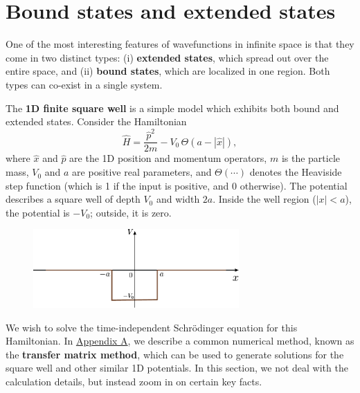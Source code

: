 \documentclass[pra,12pt]{revtex4}
\begin{document}
\section{Bound states and extended states}

One of the most interesting features of wavefunctions in infinite
space is that they come in two distinct types: (i) \textbf{extended
  states}, which spread out over the entire space, and (ii)
\textbf{bound states}, which are localized in one region.  Both types
can co-exist in a single system.

The \textbf{1D finite square well} is a simple model which exhibits
both bound and extended states.  Consider the Hamiltonian
$$\hat{H} = \frac{\hat{p}^2}{2m} - V_0 \,\Theta(a -|\hat{x}|),$$ where
$\hat{x}$ and $\hat{p}$ are the 1D position and momentum operators,
$m$ is the particle mass, $V_0$ and $a$ are positive real parameters,
and $\Theta(\cdots)$ denotes the Heaviside step function (which is 1
if the input is positive, and 0 otherwise).  The potential describes a
square well of depth $V_0$ and width $2a$.  Inside the well region
($|x| < a$), the potential is $-V_0$; outside, it is zero.

\begin{figure}[h]
  \centering\includegraphics[width=0.7\textwidth]{squarewell}
\end{figure}

We wish to solve the time-independent Schr\"odinger equation for this
Hamiltonian.  In \hyperref[sec:appendix]{Appendix A}, we describe a
common numerical method, known as the \textbf{transfer matrix method},
which can be used to generate solutions for the square well and other
similar 1D potentials.  In this section, we not deal with the
calculation details, but instead zoom in on certain key facts.
\end{document}
